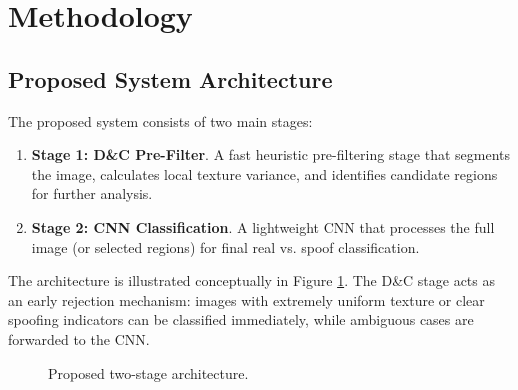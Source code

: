 \documentclass[conference]{IEEEtran}
\begin{document}
\section{Methodology}
\label{sec:methodology}

\subsection{Proposed System Architecture}

The proposed system consists of two main stages:

\begin{enumerate}
    \item \textbf{Stage 1: D\&C Pre-Filter}. A fast heuristic pre-filtering stage that segments the image, calculates local texture variance, and identifies candidate regions for further analysis.
    \item \textbf{Stage 2: CNN Classification}. A lightweight CNN that processes the full image (or selected regions) for final real vs. spoof classification.
\end{enumerate}

The architecture is illustrated conceptually in Figure \ref{fig:architecture}. The D\&C stage acts as an early rejection mechanism: images with extremely uniform texture or clear spoofing indicators can be classified immediately, while ambiguous cases are forwarded to the CNN.

\begin{figure}[htbp]
\centering
{}
\caption{Proposed two-stage architecture.}
\label{fig:architecture}
\end{figure}
\end{document}
